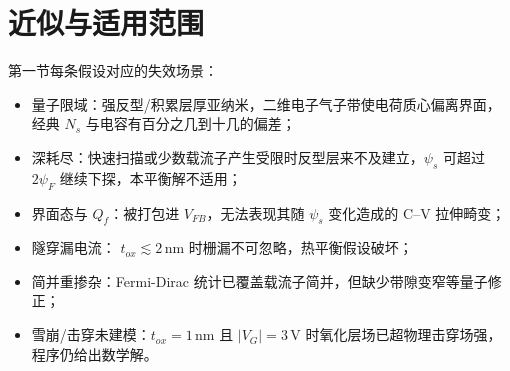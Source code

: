 \documentclass[11pt]{ctexart}
\begin{document}
\section{近似与适用范围}

第一节每条假设对应的失效场景：
\begin{itemize}
  \item 量子限域：强反型/积累层厚亚纳米，二维电子气子带使电荷质心偏离界面，经典 $N_s$ 与电容有百分之几到十几的偏差；
  \item 深耗尽：快速扫描或少数载流子产生受限时反型层来不及建立，$\psi_s$ 可超过 $2\psi_F$ 继续下探，本平衡解不适用；
  \item 界面态与 $Q_f$：被打包进 $V_{FB}$，无法表现其随 $\psi_s$ 变化造成的 C–V 拉伸畸变；
  \item 隧穿漏电流：%
  \(t_{ox}\lesssim 2\,\mathrm{nm}\) 时栅漏不可忽略，热平衡假设破坏；
  \item 简并重掺杂：Fermi-Dirac 统计已覆盖载流子简并，但缺少带隙变窄等量子修正；
  \item 雪崩/击穿未建模：$t_{ox}=1\,\mathrm{nm}$ 且 $|V_G|=3\,\mathrm{V}$ 时氧化层场已超物理击穿场强，程序仍给出数学解。
\end{itemize}
\end{document}
